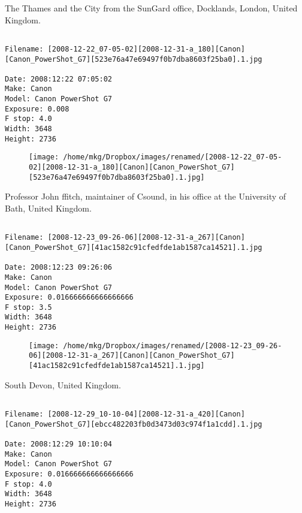 \clearpage
\onecolumn
\noindent The Thames and the City from the SunGard office, Docklands, London, United Kingdom.
\noindent
\begin{lstlisting}

Filename: [2008-12-22_07-05-02][2008-12-31-a_180][Canon][Canon_PowerShot_G7][523e76a47e69497f0b7dba8603f25ba0].1.jpg

Date: 2008:12:22 07:05:02
Make: Canon
Model: Canon PowerShot G7
Exposure: 0.008
F stop: 4.0
Width: 3648
Height: 2736
\end{lstlisting}
\clearpage

\begin{figure}
\texttt{[image: /home/mkg/Dropbox/images/renamed/[2008-12-22\_07-05-02][2008-12-31-a\_180][Canon][Canon\_PowerShot\_G7][523e76a47e69497f0b7dba8603f25ba0].1.jpg]}
\end{figure}
    
\clearpage
\onecolumn
\noindent Professor John ffitch, maintainer of Csound, in his office at the University of Bath, United Kingdom.
\noindent
\begin{lstlisting}

Filename: [2008-12-23_09-26-06][2008-12-31-a_267][Canon][Canon_PowerShot_G7][41ac1582c91cfedfde1ab1587ca14521].1.jpg

Date: 2008:12:23 09:26:06
Make: Canon
Model: Canon PowerShot G7
Exposure: 0.016666666666666666
F stop: 3.5
Width: 3648
Height: 2736
\end{lstlisting}
\clearpage

\begin{figure}
\texttt{[image: /home/mkg/Dropbox/images/renamed/[2008-12-23\_09-26-06][2008-12-31-a\_267][Canon][Canon\_PowerShot\_G7][41ac1582c91cfedfde1ab1587ca14521].1.jpg]}
\end{figure}
    
\clearpage
\onecolumn
\noindent South Devon, United Kingdom.
\noindent
\begin{lstlisting}

Filename: [2008-12-29_10-10-04][2008-12-31-a_420][Canon][Canon_PowerShot_G7][ebcc482203fb0d3473d03c974f1a1cdd].1.jpg

Date: 2008:12:29 10:10:04
Make: Canon
Model: Canon PowerShot G7
Exposure: 0.016666666666666666
F stop: 4.0
Width: 3648
Height: 2736
\end{lstlisting}
\clearpage

